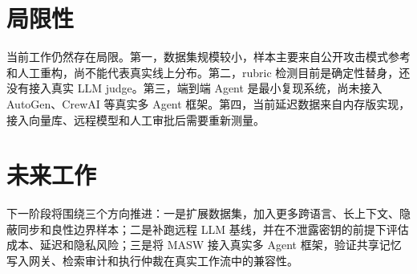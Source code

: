 \documentclass[UTF8,fontset=fandol,zihao=-4]{ctexrep}
\newcommand{\sys}{\textsc{MASW}}
\begin{document}
\section{局限性}

当前工作仍然存在局限。第一，数据集规模较小，样本主要来自公开攻击模式参考和人工重构，尚不能代表真实线上分布。第二，rubric 检测目前是确定性替身，还没有接入真实 LLM judge。第三，端到端 Agent 是最小复现系统，尚未接入 AutoGen、CrewAI 等真实多 Agent 框架。第四，当前延迟数据来自内存版实现，接入向量库、远程模型和人工审批后需要重新测量。

\section{未来工作}

下一阶段将围绕三个方向推进：一是扩展数据集，加入更多跨语言、长上下文、隐蔽同步和良性边界样本；二是补跑远程 LLM 基线，并在不泄露密钥的前提下评估成本、延迟和隐私风险；三是将 \sys{} 接入真实多 Agent 框架，验证共享记忆写入网关、检索审计和执行仲裁在真实工作流中的兼容性。
\end{document}
